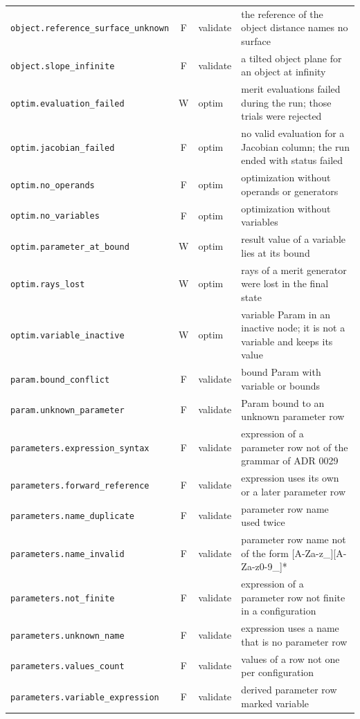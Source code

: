 \documentclass[11pt,a4paper,openany]{book}
\begin{document}
{\begin{longtable}{@{}L{6.1cm}cL{1.3cm}L{6.9cm}@{}}
\texttt{object.reference\_surface\_unknown} & F & validate & the reference of the object distance names no surface \\
\texttt{object.slope\_infinite} & F & validate & a tilted object plane for an object at infinity \\
\texttt{optim.evaluation\_failed} & W & optim & merit evaluations failed during the run; those trials were rejected \\
\texttt{optim.jacobian\_failed} & F & optim & no valid evaluation for a Jacobian column; the run ended with status failed \\
\texttt{optim.no\_operands} & F & optim & optimization without operands or generators \\
\texttt{optim.no\_variables} & F & optim & optimization without variables \\
\texttt{optim.parameter\_at\_bound} & W & optim & result value of a variable lies at its bound \\
\texttt{optim.rays\_lost} & W & optim & rays of a merit generator were lost in the final state \\
\texttt{optim.variable\_inactive} & W & optim & variable Param in an inactive node; it is not a variable and keeps its value \\
\texttt{param.bound\_conflict} & F & validate & bound Param with variable or bounds \\
\texttt{param.unknown\_parameter} & F & validate & Param bound to an unknown parameter row \\
\texttt{parameters.expression\_syntax} & F & validate & expression of a parameter row not of the grammar of ADR 0029 \\
\texttt{parameters.forward\_reference} & F & validate & expression uses its own or a later parameter row \\
\texttt{parameters.name\_duplicate} & F & validate & parameter row name used twice \\
\texttt{parameters.name\_invalid} & F & validate & parameter row name not of the form [A-Za-z\_][A-Za-z0-9\_]* \\
\texttt{parameters.not\_finite} & F & validate & expression of a parameter row not finite in a configuration \\
\texttt{parameters.unknown\_name} & F & validate & expression uses a name that is no parameter row \\
\texttt{parameters.values\_count} & F & validate & values of a row not one per configuration \\
\texttt{parameters.variable\_expression} & F & validate & derived parameter row marked variable \\

\end{longtable}}
\end{document}
